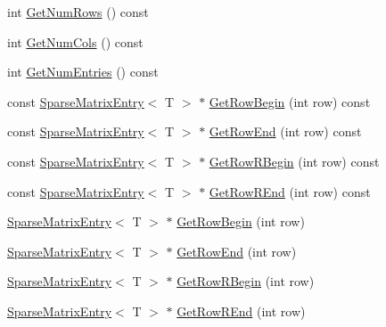 \begin{DoxyCompactItemize}
\item 
int \hyperlink{class_c_o_n_t_r_a_l_i_g_n_1_1_sparse_matrix_a714352a00d4aa1f849a5963718313962}{Get\+Num\+Rows} () const 
\item 
int \hyperlink{class_c_o_n_t_r_a_l_i_g_n_1_1_sparse_matrix_a563216fb1b9832c227409a805af7194f}{Get\+Num\+Cols} () const 
\item 
int \hyperlink{class_c_o_n_t_r_a_l_i_g_n_1_1_sparse_matrix_af7c8fe173731a321431ab96e5c52bd2d}{Get\+Num\+Entries} () const 
\item 
const \hyperlink{struct_c_o_n_t_r_a_l_i_g_n_1_1_sparse_matrix_entry}{Sparse\+Matrix\+Entry}$<$ T $>$ $\ast$ \hyperlink{class_c_o_n_t_r_a_l_i_g_n_1_1_sparse_matrix_a62f88485914392b5328e46d3ae358ae0}{Get\+Row\+Begin} (int row) const 
\item 
const \hyperlink{struct_c_o_n_t_r_a_l_i_g_n_1_1_sparse_matrix_entry}{Sparse\+Matrix\+Entry}$<$ T $>$ $\ast$ \hyperlink{class_c_o_n_t_r_a_l_i_g_n_1_1_sparse_matrix_a3647f286c1e3eeeb942a9e40bf987c16}{Get\+Row\+End} (int row) const 
\item 
const \hyperlink{struct_c_o_n_t_r_a_l_i_g_n_1_1_sparse_matrix_entry}{Sparse\+Matrix\+Entry}$<$ T $>$ $\ast$ \hyperlink{class_c_o_n_t_r_a_l_i_g_n_1_1_sparse_matrix_aa7ee8b9e02eb3ea217c3e8e407539412}{Get\+Row\+R\+Begin} (int row) const 
\item 
const \hyperlink{struct_c_o_n_t_r_a_l_i_g_n_1_1_sparse_matrix_entry}{Sparse\+Matrix\+Entry}$<$ T $>$ $\ast$ \hyperlink{class_c_o_n_t_r_a_l_i_g_n_1_1_sparse_matrix_a037d8f2e5a24d500ea37ce07a42f5dd9}{Get\+Row\+R\+End} (int row) const 
\item 
\hyperlink{struct_c_o_n_t_r_a_l_i_g_n_1_1_sparse_matrix_entry}{Sparse\+Matrix\+Entry}$<$ T $>$ $\ast$ \hyperlink{class_c_o_n_t_r_a_l_i_g_n_1_1_sparse_matrix_af602f644ea2e56ab36cc37380531a55c}{Get\+Row\+Begin} (int row)
\item 
\hyperlink{struct_c_o_n_t_r_a_l_i_g_n_1_1_sparse_matrix_entry}{Sparse\+Matrix\+Entry}$<$ T $>$ $\ast$ \hyperlink{class_c_o_n_t_r_a_l_i_g_n_1_1_sparse_matrix_ae0b45ab5e80634422808fb0c08c2a76d}{Get\+Row\+End} (int row)
\item 
\hyperlink{struct_c_o_n_t_r_a_l_i_g_n_1_1_sparse_matrix_entry}{Sparse\+Matrix\+Entry}$<$ T $>$ $\ast$ \hyperlink{class_c_o_n_t_r_a_l_i_g_n_1_1_sparse_matrix_a4bb14a437aa387953c85f9fb3d01ccee}{Get\+Row\+R\+Begin} (int row)
\item 
\hyperlink{struct_c_o_n_t_r_a_l_i_g_n_1_1_sparse_matrix_entry}{Sparse\+Matrix\+Entry}$<$ T $>$ $\ast$ \hyperlink{class_c_o_n_t_r_a_l_i_g_n_1_1_sparse_matrix_a080e58b866e9cba745e1da5b0105991d}{Get\+Row\+R\+End} (int row)

\end{DoxyCompactItemize}
